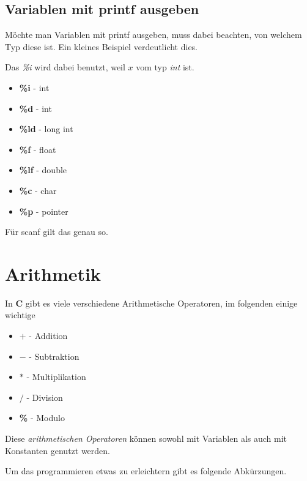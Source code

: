 \documentclass[c_worksheet.tex]{subfiles}
\begin{document}
\subsection{Variablen mit printf ausgeben} 

Möchte man Variablen mit printf ausgeben, muss dabei beachten, von welchem Typ diese ist. Ein kleines Beispiel verdeutlicht dies.



Das \emph{\%i} wird dabei benutzt, weil \(x\) vom typ \emph{int} ist.

\begin{itemize}
	\item \textbf{\%i} - int
	\item \textbf{\%d} - int
	\item \textbf{\%ld} - long int
	\item \textbf{\%f} - float
	\item \textbf{\%lf} - double
	\item \textbf{\%c} - char
	\item \textbf{\%p} - pointer 
\end{itemize}

Für scanf gilt das genau so.

\section{Arithmetik}

In \textbf{C} gibt es viele verschiedene Arithmetische Operatoren, im folgenden einige wichtige

\begin{itemize}
 	\item \textbf{\(+\)} - Addition
 	\item \textbf{\(-\)} - Subtraktion
 	\item \textbf{\(*\)} - Multiplikation
 	\item \textbf{\(/\)} - Division
 	\item \textbf{\%} - Modulo   
 \end{itemize} 

 Diese \emph{arithmetischen Operatoren} können sowohl mit Variablen als auch mit Konstanten genutzt werden.

  

Um das programmieren etwas zu erleichtern gibt es folgende Abkürzungen.

 
\end{document}
